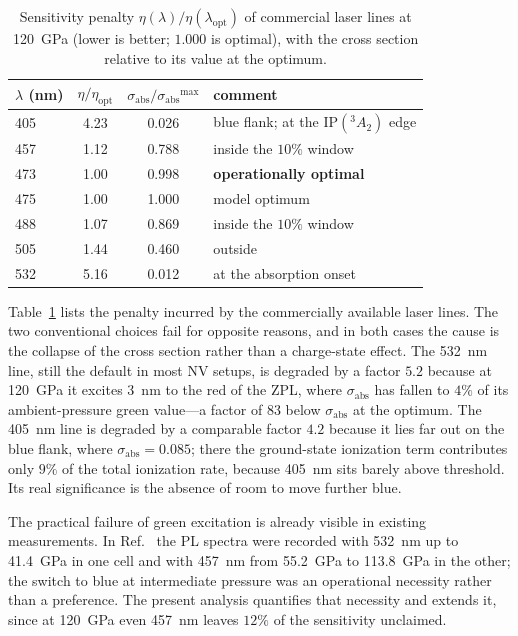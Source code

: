 \documentclass[preprint,12pt]{elsarticle}
\newcommand{\gsA}{\ensuremath{^{3}\!A_{2}}}
\newcommand{\sabs}{\ensuremath{\sigma_{\mathrm{abs}}}}
\newcommand{\lopt}{\ensuremath{\lambda_{\mathrm{opt}}}}
\begin{document}
\begin{table}[t]
  \centering
  \caption{Sensitivity penalty $\eta(\lambda)/\eta(\lopt)$ of commercial laser
  lines at \SI{120}{\giga\pascal} (lower is better; $1.000$ is optimal), with the
  cross section relative to its value at the optimum.}
  \label{tab:lines}
  \begin{tabular}{lccl}
    \toprule
    $\lambda$ (nm) & $\eta/\eta_{\mathrm{opt}}$ & $\sabs/\sabs^{\max}$ & comment \\
    \midrule
    405 & 4.23  & 0.026 & blue flank; at the $\mathrm{IP}(\gsA)$ edge \\
    457 & 1.12  & 0.788 & inside the $10\%$ window \\
    473 & 1.00  & 0.998 & \textbf{operationally optimal} \\
    475 & 1.00  & 1.000 & model optimum \\
    488 & 1.07  & 0.869 & inside the $10\%$ window \\
    505 & 1.44  & 0.460 & outside \\
    532 & 5.16  & 0.012 & at the absorption onset \\
    \bottomrule
  \end{tabular}
\end{table}

Table~\ref{tab:lines} lists the penalty incurred by the commercially available
laser lines. The two conventional choices fail for opposite reasons, and in both
cases the cause is the collapse of the cross section rather than a charge-state
effect. The \SI{532}{\nano\meter} line, still the default in most NV setups, is
degraded by a factor $5.2$ because at \SI{120}{\giga\pascal} it excites
\SI{3}{\nano\meter} to the red of the ZPL, where $\sabs$ has fallen to $4\%$ of
its ambient-pressure green value---a factor of $83$ below $\sabs$ at the
optimum. The \SI{405}{\nano\meter} line is degraded by a comparable factor $4.2$
because it lies far out on the blue flank, where $\sabs = 0.085$; there the
ground-state ionization term contributes only $9\%$ of the total ionization rate,
because \SI{405}{\nano\meter} sits barely above threshold. Its real significance
is the absence of room to move further blue.

The practical failure of green excitation is already visible in existing
measurements. In Ref.~\cite{Ho2026} the PL spectra were recorded with
\SI{532}{\nano\meter} up to \SI{41.4}{\giga\pascal} in one cell and with
\SI{457}{\nano\meter} from \SI{55.2}{\giga\pascal} to
\SI{113.8}{\giga\pascal} in the other; the switch to blue at intermediate
pressure was an operational necessity rather than a preference. The present
analysis quantifies that necessity and extends it, since at
\SI{120}{\giga\pascal} even \SI{457}{\nano\meter} leaves $12\%$ of the
sensitivity unclaimed.
\end{document}
